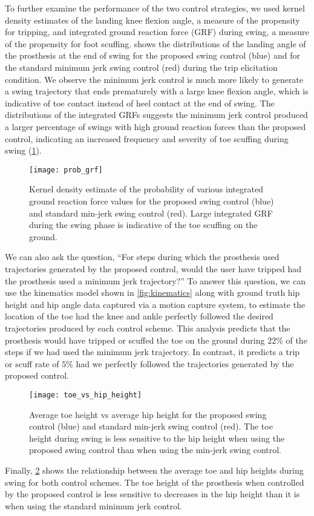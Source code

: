 To further examine the performance of the two control strategies, we used kernel
density estimates of the landing knee flexion angle, a measure of the propensity
for tripping, and integrated ground reaction force (GRF) during swing, a measure
of the propensity for foot scuffing.  shows the
distributions of the landing angle of the prosthesis at the end of swing for the
proposed swing control (blue) and for the standard minimum jerk swing control
(red) during the trip elicitation condition. We observe the minimum jerk control
is much more likely to generate a swing trajectory that ends prematurely with a
large knee flexion angle, which is indicative of toe contact instead of heel
contact at the end of swing.  The distributions of the integrated GRFs suggests
the minimum jerk control produced a larger percentage of swings with high ground
reaction forces than the proposed control, indicating an increased frequency and
severity of toe scuffing during swing (\cref{fig:p_grf}). 
\begin{figure}[t]
    \centering
    \texttt{[image: prob\_grf]}
    \caption[Kernel density estimate of the probability of integrated ground
    reaction force]{Kernel density estimate of the probability of various
    integrated ground reaction force values for the proposed swing control
    (blue) and standard min-jerk swing control (red). Large integrated GRF
    during the swing phase is indicative of the toe scuffing on the
    ground.}\label{fig:p_grf}
\end{figure}

We can also ask the question, ``For steps during which the prosthesis used
trajectories generated by the proposed control, would the user have tripped had
the prosthesis used a minimum jerk trajectory?'' To answer this question, we can
use the kinematics model shown in \cref{fig:kinematics} along with ground truth
hip height and hip angle data captured via a motion capture system, to estimate
the location of the toe had the knee and ankle perfectly followed the desired
trajectories produced by each control scheme. This analysis predicts that the
prosthesis would have tripped or scuffed the toe on the ground during $22\%$ of
the steps if we had used the minimum jerk trajectory. In contrast, it predicts a
trip or scuff rate of $5\%$ had we perfectly followed the trajectories generated
by the proposed control.

\begin{figure}[t]
    \centering
    \texttt{[image: toe\_vs\_hip\_height]}
    \caption[Average toe height vs average hip height]{Average toe height vs
    average hip height for the proposed swing control (blue) and standard
    min-jerk swing control (red). The toe height during swing is less sensitive
    to the hip height when using the proposed swing control than when using the
    min-jerk swing control.}\label{fig:toe_vs_hip}
\end{figure}

Finally, \cref{fig:toe_vs_hip} shows the relationship between the average
toe and hip heights during swing for both control schemes. The toe height of the
prosthesis when controlled by the proposed control is less sensitive to
decreases in the hip height than it is when using the standard minimum jerk
control.
